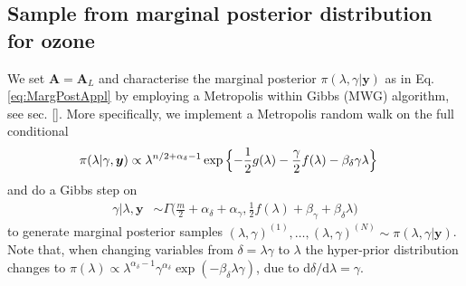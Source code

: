 \subsection{Sample from marginal posterior distribution for ozone}
\label{subsec:firstMarg}
We set $\bm{A} = \bm{A}_L$ and characterise the marginal posterior $\pi(\lambda, \gamma | \bm{y})$ as in Eq. \ref{eq:MargPostAppl} by employing a Metropolis within Gibbs (MWG) algorithm, see sec. \ref{}.
More specifically, we implement a Metropolis random walk on the full conditional
\begin{align}
	\label{eq:lamCondPrior}
	\pi(\lambda | \gamma, \bm{y}) &\propto \lambda^{n/2+\alpha_\delta -1} \exp{\Bigl\{ - \frac{1}{2} g ( \lambda) - \frac{\gamma}{2} f ( \lambda) - \beta_\delta \gamma \lambda \Bigr\}} 
\end{align} 
and do a Gibbs step on
\begin{align}
	\gamma |  \lambda, \bm{y} &\sim \Gamma \bigg( \frac{m}{2} + \alpha_\delta + \alpha_\gamma, \frac{1}{2} f (\lambda ) + \beta_\gamma + \beta_\delta \lambda \bigg)\label{eq:GibbsStep}
\end{align} 
to generate marginal posterior samples $(\lambda, \gamma)^{(1)}, \dots, (\lambda, \gamma)^{(N)} \sim  \pi(\lambda, \gamma| \bm{y})$.
Note that, when changing variables from $\delta = \lambda \gamma$ to $\lambda$ the hyper-prior distribution changes to $\pi(\lambda) \propto \lambda^{\alpha_\delta-1} \gamma^{\alpha_\delta} \exp{(- \beta_\delta \lambda  \gamma)} $, due to $\text{d}\delta / \text{d} \lambda = \gamma$.

